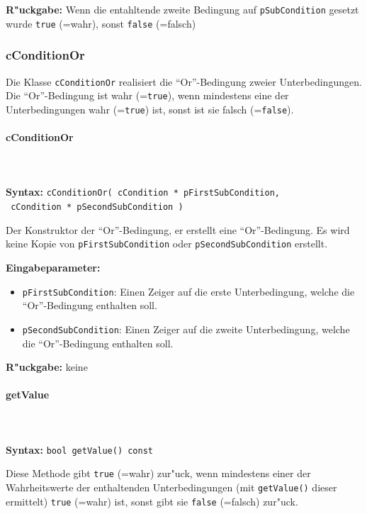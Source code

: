 \bigskip\noindent
\textbf{R"uckgabe:} Wenn die entahltende zweite Bedingung auf \verb|pSubCondition| gesetzt wurde \verb|true| (=wahr), sonst \verb|false| (=falsch)


\subsubsection{cConditionOr}

Die Klasse \verb|cConditionOr| realisiert die ``Or''-Bedingung zweier Unterbedingungen. Die ``Or''-Bedingung ist wahr (=\verb|true|), wenn mindestens eine der Unterbedingungen wahr (=\verb|true|) ist, sonst ist sie falsch  (=\verb|false|).

\paragraph{cConditionOr}

\ \\\\\noindent
\textbf{Syntax:} \verb|cConditionOr( cCondition * pFirstSubCondition,| \\\verb| cCondition * pSecondSubCondition )|

\bigskip\noindent
Der Konstruktor der ``Or''-Bedingung, er erstellt eine ``Or''-Bedingung. Es wird keine Kopie von \verb|pFirstSubCondition| oder \verb|pSecondSubCondition| erstellt.

\bigskip\noindent
\textbf{Eingabeparameter:}
\begin{itemize}
 \item \verb|pFirstSubCondition|: Einen Zeiger auf die erste Unterbedingung, welche die ``Or''-Bedingung enthalten soll.
 \item \verb|pSecondSubCondition|: Einen Zeiger auf die zweite Unterbedingung, welche die ``Or''-Bedingung enthalten soll.
\end{itemize}

\bigskip\noindent
\textbf{R"uckgabe:} keine


\paragraph{getValue}

\ \\\\\noindent
\textbf{Syntax:} \verb|bool getValue() const|

\bigskip\noindent
Diese Methode gibt \verb|true| (=wahr) zur"uck, wenn mindestens einer der Wahrheitswerte der enthaltenden Unterbedingungen (mit \verb|getValue()| dieser ermittelt) \verb|true| (=wahr) ist, sonst gibt sie \verb|false| (=falsch) zur"uck.

